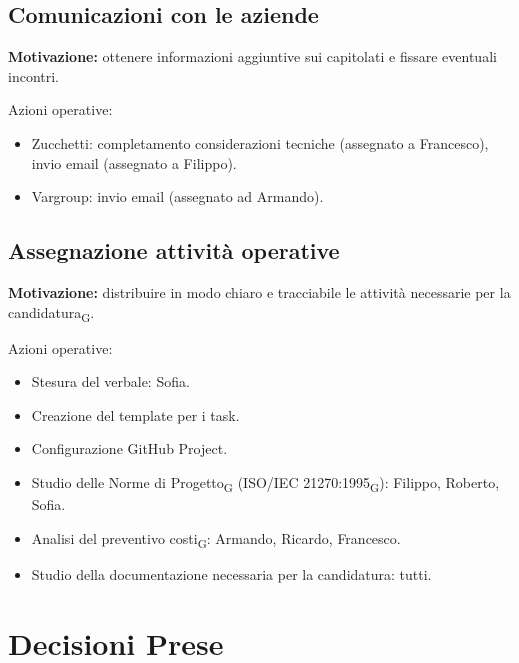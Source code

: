 \subsection{Comunicazioni con le aziende}
\textbf{Motivazione:} ottenere informazioni aggiuntive sui capitolati e fissare eventuali incontri.

Azioni operative:
\begin{itemize}
    \item Zucchetti: completamento considerazioni tecniche (assegnato a Francesco), invio email (assegnato a Filippo).
    \item Vargroup: invio email (assegnato ad Armando).
\end{itemize}

\subsection{Assegnazione attività operative}
\textbf{Motivazione:} distribuire in modo chiaro e tracciabile le attività necessarie per la candidatura\textsubscript{G}.

Azioni operative:
\begin{itemize}
    \item Stesura del verbale: Sofia.
    \item Creazione del template per i task.
    \item Configurazione GitHub Project.
    \item Studio delle Norme di Progetto\textsubscript{G} (ISO/IEC 21270:1995\textsubscript{G}): Filippo, Roberto, Sofia.
    \item Analisi del preventivo costi\textsubscript{G}: Armando, Ricardo, Francesco.
    \item Studio della documentazione necessaria per la candidatura: tutti.
\end{itemize}

\section{Decisioni Prese}

